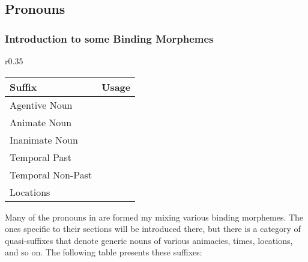   \subsection{Pronouns}
    \subsubsection{Introduction to some Binding Morphemes}
    \begin{wrapfigure}{r}{0.35\textwidth}
      \begin{tabular}{|l|l|}
        \hline
        Suffix            & Usage                        \\ \hline \hline
        Agentive Noun     & \suffixtext{\agtsuffix}      \\
        Animate Noun      & \suffixtext{\animsuffix}     \\
        Inanimate Noun    & \suffixtext{\inansuffix}     \\
        Temporal Past     & \suffixtext{\pastsuffix}     \\
        Temporal Non-Past & \suffixtext{\nonpastsuffix}  \\
        Locations         & \suffixtext{\locationsuffix} \\ \hline
      \end{tabular}
    \end{wrapfigure}
    Many of the pronouns in \langname are formed my mixing various binding morphemes. The ones specific to their sections will be introduced there, but there is a category of quasi-suffixes that denote generic nouns of various animacies, times, locations, and so on. The following table presents these suffixes:
    \par\vertspace

